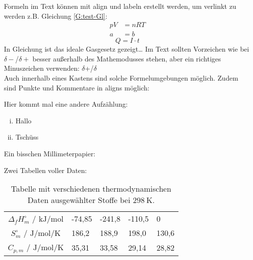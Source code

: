 \documentclass[./main.tex]{subfiles}
\begin{document}
Formeln im Text können mit align und labeln erstellt werden, um verlinkt zu werden z.B. Gleichung \ref{G:test-Gl}:
\begin{align}
    pV &= nRT \label{G:test-Gl}\\
    a &= b
\end{align}
\begin{equation*}
    Q = I \cdot t
\end{equation*}
In Gleichung ist das ideale Gasgesetz gezeigt\ldots 
Im Text sollten Vorzeichen wie bei $\delta-$/$\delta+$ besser au\ss{}erhalb des Mathemodusses stehen, aber ein richtiges Minuszeichen verwenden: $\delta$+/$\delta$\textminus{}\\
Auch innerhalb eines Kastens sind solche Formelumgebungen möglich. Zudem sind Punkte und Kommentare in aligns möglich:\par
{}
Hier kommt mal eine andere Aufz\"ahlung:\\
\begin{enumerate}[(i)]
    \item Hallo
    \item Tschüss
\end{enumerate}

Ein bisschen Millimeterpapier:\\


Zwei Tabellen voller Daten:
\begin{table}[H]
    \caption{Tabelle mit verschiedenen thermodynamischen Daten ausgew\"ahlter Stoffe bei $\SI{298}{\kelvin}$.}
    \label{tab: 2025-10-3_therm. Daten}
    \centering
    \begin{tabular}{|c|C{1.5cm}|C{1.5cm}|C{1.5cm}|C{1.5cm}|}
    \hline
        &  &  &  & \\\hline
        $\Delta_fH^{\circ}_m$ / $\si{\kilo\joule\per\mole}$ & -74,85 & -241,8 & -110,5 & 0\\\hline
        $S^{\circ}_m$ / $\si{\joule\per\mole\per\kelvin}$ & 186,2 & 188,9 & 198,0 & 130,6\\\hline
        $C_{p, m}$ / $\si{\joule\per\mole\per\kelvin}$ & 35,31 & 33,58 & 29,14 & 28,82\\\hline
    \end{tabular}
\end{table}
\end{document}
